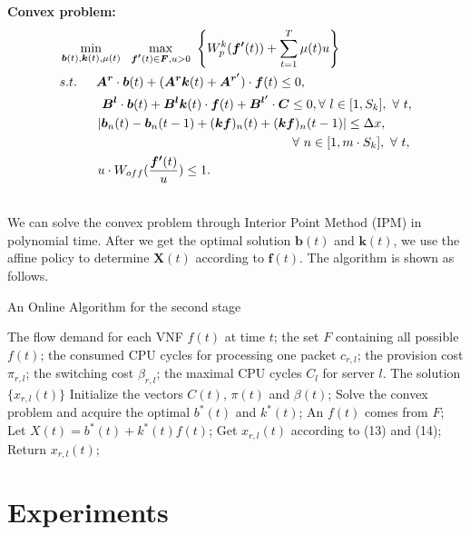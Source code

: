 \documentclass{acmtog}
\begin{document}
{\noindent\bf Convex problem: }\\
\begin{subequations}
\begin{align}
&\min_{\bm{b}(t),\bm{k}(t),\mu(t)}~~\max_{\bm{f'}(t)\in\bm{F},u>0}~  \left\{ W_p^k(\bm{f'}(t))+\sum_{t=1}^{T}\mu(t)u \right\} \quad~~ \\
& s.t. \indent\bm{A^r}\cdot\bm{b}(t)+(\bm{A^r}\bm{k}(t)+\bm{A^{r'}})\cdot\bm{f}(t) \leq 0,\\
& \indent\indent~\bm{B^l}\cdot\bm{b}(t)+\bm{B^l}\bm{k}(t)\cdot\bm{f}(t)+ \bm{B^{l'}}\cdot \bm{C} \leq 0,\forall~l\in [1,S_k],~\forall~t,\\
& \indent\indent|\bm{b}_n(t)-\bm{b}_n(t-1)+(\bm{k}\bm{f})_n(t)+(\bm{k}\bm{f})_n(t-1)| \leq \Delta x,\\
&  ~\quad\quad\quad\quad\quad\quad\quad\quad\quad\quad\quad\quad\quad\quad\quad\quad\quad\quad\forall ~n\in [1,m\cdot S_k],~\forall~t,\\
&  \indent\indent u\cdot W_{off}(\frac{\bm{f'}(t)}{u})\leq 1.
\end{align}
\end{subequations}

\\\indent We can solve the convex problem through Interior Point Method (IPM) in polynomial time. After we get the optimal solution $\bm{b}(t)$ and $\bm{k}(t)$, we use the affine policy to determine $\bm{X}(t)$ according to $\bm{f}(t)$. The algorithm is shown as follows.


\begin{algorithm}[h!]
\setcounter{algorithm}{1}
\caption{An Online Algorithm for the second stage}
\begin{algorithmic}[1]
\REQUIRE The flow demand for each VNF $f(t)$ at time $t$; the set $F$ containing all possible $f(t)$; the consumed CPU cycles for processing one packet $c_{r,l}$; the provision cost $\pi_{r,l}$; the switching cost $\beta_{r,l}$; the maximal CPU cycles $C_l$ for server $l$.
\ENSURE The solution $\{ x_{r,l}(t) \}$
\STATE Initialize the vectors $C(t)$, $\pi(t)$ and $\beta(t)$;
\STATE Solve the convex problem and acquire the optimal $b^*(t)$ and $k^*(t)$;
\STATE An $f(t)$ comes from $F$;
\STATE Let $X(t)=b^*(t)+k^*(t)f(t)$;
\STATE Get $x_{r,l}(t)$ according to (13) and (14);
\STATE Return $x_{r,l}(t)$;
\ENDFOR
\end{algorithmic}
\end{algorithm}


\section{Experiments}
\end{document}
